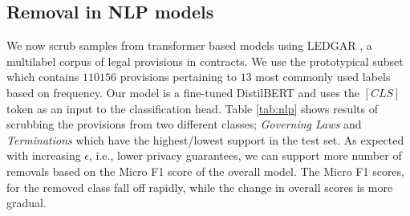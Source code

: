 \subsection{Removal in NLP models}
We now scrub samples from transformer based models using  LEDGAR \citep{tuggener2020ledgar}, a multilabel corpus of legal provisions in contracts. We use the prototypical subset which contains $110156$ provisions pertaining to $13$ most commonly used labels based on frequency. Our model is a fine-tuned DistilBERT \citep{sanh2019distilbert} and uses the $[CLS]$ token as an input to the classification head. 
Table \ref{tab:nlp} shows results of scrubbing the provisions from two different classes; \textit{Governing Laws} and \textit{Terminations} which have the highest/lowest support in the test set. As expected with increasing $\epsilon$, i.e., lower privacy guarantees, we can support more number of removals based on the Micro F1 score of the overall model. 
The Micro F1 scores, for the removed class fall off rapidly, while the change in overall scores is more gradual. 



